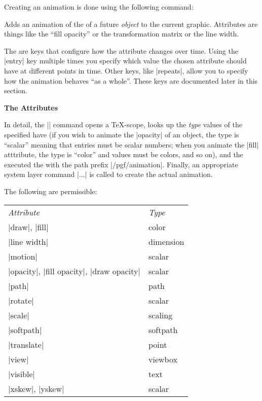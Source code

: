 Creating an animation is done using the following command:

\begin{command}{\pgfanimateattribute{}}
  Adds an animation of the  of a future \emph{object}
  to the current graphic. Attributes are things like the ``fill
  opacity'' or the transformation matrix or the line width.

  The  are keys that configure how the attribute changes
  over time. Using the |entry| key multiple times you specify which
  value the chosen attribute should have at different points in
  time. Other keys, like |repeats|, allow you to specify how the
  animation behaves ``as a whole''. These keys are documented later in
  this section.

\begin{codeexample}[]
\end{codeexample}

  \medskip
  \textbf{The Attributes}
  
  In detail, the |\pgfanimateattribute| command opens a \TeX-scope,
  looks up the \emph{type} values of the specified 
  have (if you wish to animate the |opacity| of an object, the type is
  ``scalar'' meaning that entries must be scalar numbers; when you
  animate the |fill| atttribute, the type is ``color'' and values 
  must be colors, and so on), and the executed the  with
  the path prefix |/pgf/animation|. Finally, an appropriate system
  layer command |\pgfsysanimate...| is called to create the actual
  animation.

  The following  are permissible:
  
  \begin{tabular}{ll}
    \emph{Attribute} & \emph{Type} \\
    |draw|, |fill|              & color \\
    |line width|                & dimension \\
    |motion|                    & scalar \\
    |opacity|, |fill opacity|, |draw opacity|              & scalar \\
    |path|                      & path \\
    |rotate|                    & scalar \\
    |scale|                     & scaling \\
    |softpath|                  & softpath \\
    |translate|                 & point \\
    |view|                      & viewbox \\
    |visible|                   & text \\
    |xskew|, |yskew|            & scalar \\
  \end{tabular}


\end{command}
